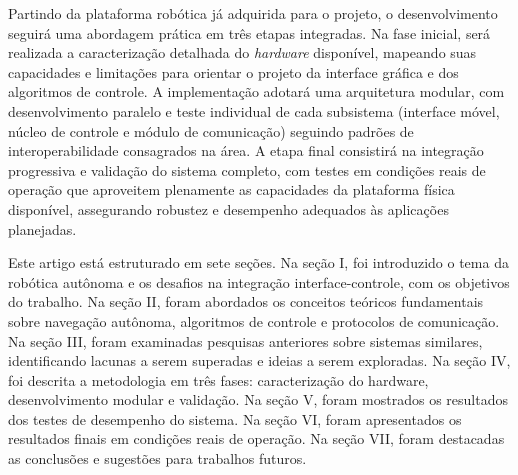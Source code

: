 
Partindo da plataforma robótica já adquirida para o projeto, o desenvolvimento seguirá uma abordagem prática em três etapas integradas. Na fase inicial, será realizada a caracterização detalhada do \textit{hardware} disponível, mapeando suas capacidades e limitações para orientar o projeto da interface gráfica e dos algoritmos de controle. A implementação adotará uma arquitetura modular, com desenvolvimento paralelo e teste individual de cada subsistema (interface móvel, núcleo de controle e módulo de comunicação) seguindo padrões de interoperabilidade consagrados na área. A etapa final consistirá na integração progressiva e validação do sistema completo, com testes em condições reais de operação que aproveitem plenamente as capacidades da plataforma física disponível, assegurando robustez e desempenho adequados às aplicações planejadas.


Este artigo está estruturado em sete seções. Na seção I, foi introduzido o tema da robótica autônoma e os desafios na integração interface-controle, com os objetivos do trabalho. Na seção II, foram abordados os conceitos teóricos fundamentais sobre navegação autônoma, algoritmos de controle e protocolos de comunicação. Na seção III, foram examinadas pesquisas anteriores sobre sistemas similares, identificando lacunas a serem superadas e ideias a serem exploradas. Na seção IV, foi descrita a metodologia em três fases: caracterização do hardware, desenvolvimento modular e validação. Na seção V, foram mostrados os resultados dos testes de desempenho do sistema. Na seção VI, foram apresentados os resultados finais em condições reais de operação. Na seção VII, foram destacadas as conclusões e sugestões para trabalhos futuros.
